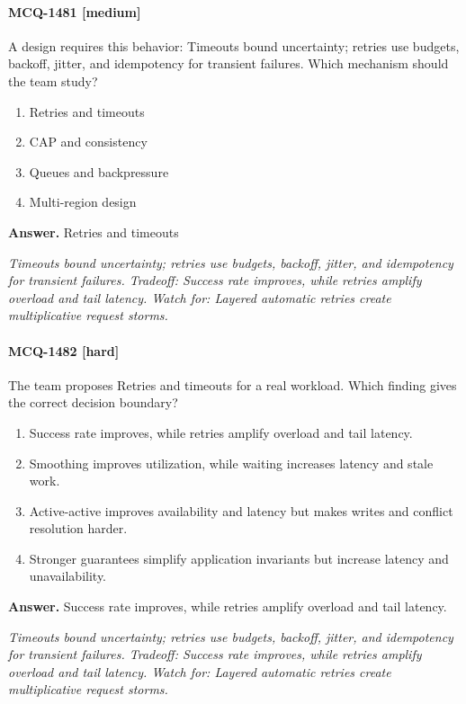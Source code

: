 \paragraph{MCQ-1481 [medium]} A design requires this behavior: Timeouts bound uncertainty; retries use budgets, backoff, jitter, and idempotency for transient failures. Which mechanism should the team study?
\begin{enumerate}[label=\Alph*.]
\item Retries and timeouts
\item CAP and consistency
\item Queues and backpressure
\item Multi-region design
\end{enumerate}
\noindent\textbf{Answer.} Retries and timeouts
\par\textit{Timeouts bound uncertainty; retries use budgets, backoff, jitter, and idempotency for transient failures. Tradeoff: Success rate improves, while retries amplify overload and tail latency. Watch for: Layered automatic retries create multiplicative request storms.}
\paragraph{MCQ-1482 [hard]} The team proposes Retries and timeouts for a real workload. Which finding gives the correct decision boundary?
\begin{enumerate}[label=\Alph*.]
\item Success rate improves, while retries amplify overload and tail latency.
\item Smoothing improves utilization, while waiting increases latency and stale work.
\item Active-active improves availability and latency but makes writes and conflict resolution harder.
\item Stronger guarantees simplify application invariants but increase latency and unavailability.
\end{enumerate}
\noindent\textbf{Answer.} Success rate improves, while retries amplify overload and tail latency.
\par\textit{Timeouts bound uncertainty; retries use budgets, backoff, jitter, and idempotency for transient failures. Tradeoff: Success rate improves, while retries amplify overload and tail latency. Watch for: Layered automatic retries create multiplicative request storms.}
